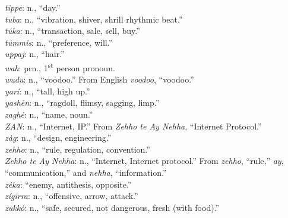 \documentclass{article}[10pt]
\begin{document}
\begin{multicols}{3}
\emph{tippe}: n., ``day.''\\
\emph{tuba}: n., ``vibration, shiver, shrill rhythmic beat.''\\
\emph{t\.{u}ka}: n., ``transaction, sale, sell, buy.''\\
\emph{t\.{u}mmis}: n., ``preference, will.''\\
\emph{uppaj}: n., ``hair.''\\
\emph{wah}: prn., 1\textsuperscript{st} person pronoun.\\
\emph{wudu}: n., ``voodoo.'' From English \emph{voodoo}, ``voodoo.''\\
\emph{yar\'{i}}: n., ``tall, high up.''\\
\emph{yash\.{e}n}: n., ``ragdoll, flimsy, sagging, limp.''\\
\emph{zagh\.{e}}: n., ``name, noun.''\\
\emph{ZAN}: n., ``Internet, IP.'' From \emph{Zehho te Ay Nehha}, ``Internet Protocol.''\\
\emph{z\.{a}g}: n., ``design, engineering.''\\
\emph{zehho}: n., ``rule, regulation, convention.''\\
\emph{Zehho te Ay Nehha}: n., ``Internet, Internet protocol.'' From \emph{zehho}, ``rule,'' \emph{ay}, ``communication,'' and \emph{nehha}, ``information.''\\
\emph{z\.{e}ka}: ``enemy, antithesis, opposite.''\\
\emph{z\'{i}girra}: n., ``offensive, arrow, attack.''\\
\emph{zukk\.{o}}: n., ``safe, secured, not dangerous, fresh (with food).''\\
\end{multicols}
\end{document}
